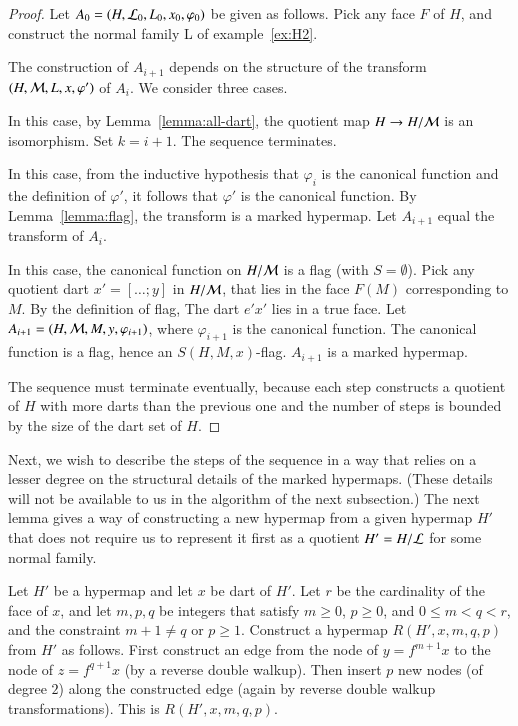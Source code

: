 \begin{proof}
Let $A_0=(H,{\cal L}_0,L_0,x_0,\varphi_0)$ be given as follows.  Pick any face $F$ of $H$, and
construct the normal family {\cal L} of example~\ref{ex:H2}. 

The construction of $A_{i+1}$ depends on the structure of the transform $(H,{\cal M},L,x,\varphi')$ of $A_i$.  We consider three
cases.
\begin{nomerate}
\item 
{}   In this case,  by
Lemma~\ref{lemma:all-dart}, the quotient map $H\to H/{\cal M}$ is an
isomorphism.  Set $k= i+1$. The sequence terminates.
\item 
{}  In this case,  from the inductive hypothesis that $\varphi_i$ is
the canonical function and the definition of $\varphi'$, it follows that $\varphi'$ is the canonical
function.  By Lemma~\ref{lemma:flag}, the transform is
a marked hypermap.  Let  $A_{i+1}$ equal the transform of $A_i$.
\item
{}
In this case, the canonical
function on $H/{\cal M}$ is a flag (with $S=\emptyset$).  Pick any quotient dart $x'=[\ldots;y]$ in $H/{\cal M}$, that
lies in the face $F(M)$ corresponding to $M$.  By the definition of flag,
The dart $e' x'$ lies in a true face.  Let
$A_{i+1} = (H,{\cal M},M,y,\varphi_{i+1})$, where $\varphi_{i+1}$ is the canonical function.
The canonical function is a flag, hence an $S(H,M,x)$-flag.  $A_{i+1}$ is a marked hypermap.
\end{nomerate}

The sequence must terminate eventually, because each step
constructs a quotient of $H$ with more darts than the previous one and
the number of steps is bounded by the size of the dart set of
$H$.
\end{proof}

Next, we wish to describe the steps of the sequence in a way that relies on a lesser degree
on the structural details of the marked hypermaps.  (These details will not be available to us
in the algorithm of the next subsection.)  The next lemma gives a way of constructing a new
hypermap from a given hypermap $H'$ that does not require us to  represent it first as a
quotient $H' = H/{\cal L}$ for some normal family.

\begin{definition}[R]\label{def:R}  
Let $H'$ be a hypermap and let $x$ be dart of $H'$.  Let  $r$ be the
cardinality of the face of $x$,
and let $m,p,q$ be integers that
satisfy $m\ge 0$, $p\ge 0$, and $0 \le m < q < r$,
and the  constraint  $m+1\ne q$ or $p\ge1$.  
Construct a hypermap $R(H',x,m,q,p)$ from $H'$ as follows.
First
construct an edge from the node of $y = f^{m+1} x$ to the node of $z =
f^{q+1} x$ (by a reverse double walkup).  Then insert $p$ new nodes (of
degree $2$) along the constructed edge (again by reverse double walkup transformations).  
This is $R(H',x,m,q,p)$.  
\end{definition}

